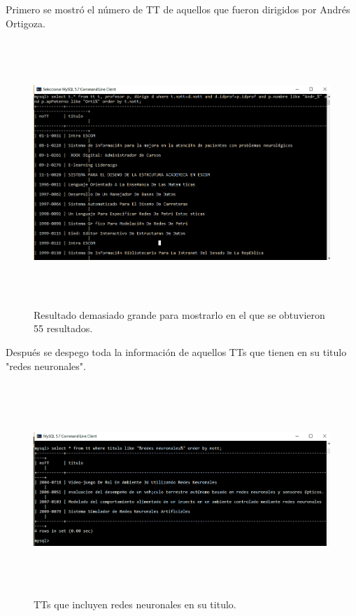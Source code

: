\documentclass[12pt, titlepage]{article}
\begin{document}
	Primero se mostró el número de TT de aquellos que fueron dirigidos por Andrés Ortigoza.
	
		\begin{figure}[H]
		\begin{center}
			\includegraphics[width=16cm, height=10cm]{img/uno.png}
			\caption{Resultado demasiado grande para mostrarlo en el que se obtuvieron 55 resultados.}
			\label{fig:ejercicio1}
		\end{center}
	\end{figure}
	
	Después se despego toda la información de aquellos TTs que tienen en su titulo "redes neuronales".
	
		\begin{figure}[H]
		\begin{center}
			\includegraphics[width=16cm, height=8cm]{img/dos.png}
			\caption{TTs que incluyen redes neuronales en su titulo.}
			\label{fig:dos}
		\end{center}
	\end{figure}
	
\end{document}
